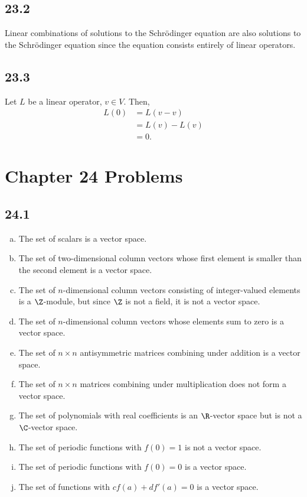 \documentclass[12pt]{mypackage}
\begin{document}
\subsection{23.2}%
Linear combinations of solutions to the Schrödinger equation are also solutions to the Schrödinger equation since the equation consists entirely of linear operators.
\subsection{23.3}%
Let $L$ be a linear operator, $v\in V$. Then,
\begin{align*}
  L\left(0\right) &= L\left(v-v\right)\\
                  &= L(v) - L(v)\\
                  &= 0.
\end{align*}
\section{Chapter 24 Problems}%
\subsection{24.1}%
\begin{enumerate}[(a)]
  \item The set of scalars is a vector space.
  \item The set of two-dimensional column vectors whose first element is smaller than the second element is a vector space.
  \item The set of $n$-dimensional column vectors consisting of integer-valued elements is a $\Z$-module, but since $\Z$ is not a field, it is not a vector space.
  \item The set of $n$-dimensional column vectors whose elements sum to zero is a vector space.
  \item The set of $n\times n$ antisymmetric matrices combining under addition is a vector space.
  \item The set of $n\times n$ matrices combining under multiplication does not form a vector space.
  \item The set of polynomials with real coefficients is an $\R$-vector space but is not a $\C$-vector space.
  \item The set of periodic functions with $f(0) = 1$ is not a vector space.
  \item The set of periodic functions with $f(0) = 0$ is a vector space.
  \item The set of functions with $cf(a) + df'(a) = 0$ is a vector space.
\end{enumerate}
\end{document}
